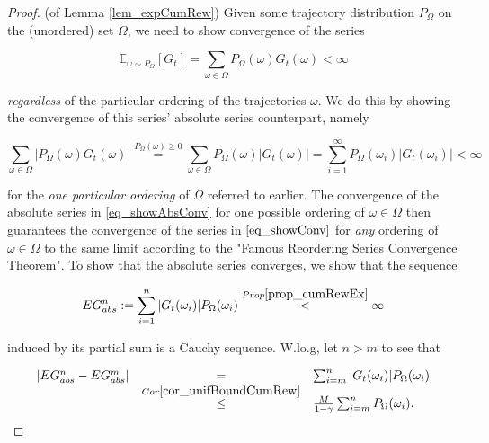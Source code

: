 \documentclass[11pt]{article} %
\begin{document}
\begin{proof}{(of Lemma \ref{lem_expCumRew})}
	Given some trajectory distribution $P_{\Omega}$ on the (unordered) set $\Omega$, we need to show convergence of the series 

\begin{equation}\label{eq_showConv}
	\mathbb{E}_{\omega \sim P_{\Omega}}[G_t] = \sum_{\omega \in \Omega} P_{\Omega}({\omega}) G_t(\omega) < \infty
\end{equation}

\textit{regardless} of the particular ordering of the trajectories $\omega$. We do this by showing the convergence of this series' absolute series counterpart, namely

\begin{equation}\label{eq_showAbsConv}
	\sum_{\omega \in \Omega} | P_{\Omega}({\omega}) G_t(\omega) | \overset{P_\Omega(\omega) \ge 0}{=} \sum_{\omega \in \Omega} P_{\Omega}({\omega}) | G_t(\omega) | = \sum_{i=1}^{\infty} P_{\Omega}({\omega_i}) | G_t(\omega_i) | < \infty
\end{equation}

for the \textit{one particular ordering} of $\Omega$ referred to earlier. The convergence of the absolute series in \ref{eq_showAbsConv} for one possible ordering of $\omega \in \Omega$ then guarantees the convergence of the series in $\ref{eq_showConv}$ for \textit{any} ordering of $\omega \in \Omega$ to the same limit according to the "Famous Reordering Series Convergence Theorem". To show that the absolute series converges, we show that the sequence

\begin{equation}\label{eq_partSeq}
	EG_{abs}^n := \sum_{i=1}^n |G_t(\omega_i)| P_\Omega(\omega_i) \overset{Prop \ref{prop_cumRewEx}}{<} \infty
\end{equation}

induced by its partial sum is a Cauchy sequence. W.lo.g, let $n>m$ to see that

\begin{equation}\label{ar_cauchySeq}
	\begin{array}{rcl}
	\left| EG_{abs}^n - EG_{abs}^m \right| 	& = & \sum_{i=m}^n |G_t(\omega_i)| P_\Omega(\omega_i) \\ 
									& \overset{Cor \ref{cor_unifBoundCumRew}}{\le} & \frac{M}{1 - \gamma} \sum_{i=m}^n  P_{\Omega}(\omega_i). \\
	\end{array}
\end{equation}


\end{proof}
\end{document}

